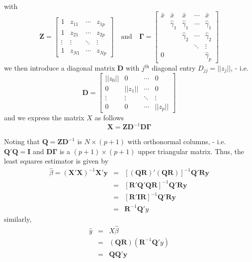 \documentclass{beamer}
\newcommand{\X}{\bm{X}}
\begin{document}
\begin{frame}
with 
\[
\bm{Z}=
\begin{bmatrix}
1 & z_{11} & \cdots & z_{1p}\\
1& z_{21} &\cdots&z_{2p}\\
\vdots&\vdots&\ddots&\vdots\\
1& z_{N1}&\cdots &z_{Np}
\end{bmatrix}\quad\text{and}\quad
\bm{\Gamma}=
\begin{bmatrix}
\bar{x}&\bar{x}&\bar{x}&\cdots&\bar{x}\\
&\hat{\gamma}_{1}&\hat{\gamma}_{1}&\cdots&\hat{\gamma}_1\\
&&\hat{\gamma}_{2}&\cdots& \hat{\gamma}_2\\
&&&\ddots&\vdots\\
0&&&&\hat{\gamma}_p
\end{bmatrix}
\]
we then introduce a diagonal matrix $\bm{D}$ with $j^{\text{th}}$ diagonal entry $D_{jj}=\lvert\lvert z_j\rvert\rvert$, - i.e. 
\[
\bm{D}=
\begin{bmatrix}
\lvert\lvert z_0\rvert\rvert&0&\cdots&0\\
0&\lvert\lvert z_1\rvert\rvert&\cdots&0\\
\vdots&\vdots&\ddots&\vdots\\
0&0&\cdots&\lvert\lvert z_p\rvert\rvert
\end{bmatrix}
\]
and we express the matrix $X$ as follows
\[
\X=\bm{Z}\bm{D}^{-1}\bm{D}\bm{\Gamma}
\]
\end{frame}
\begin{frame}
Noting that $\bm{Q}=\bm{Z}\bm{D}^{-1}$ is $N\times (p+1)$ with orthonormal columns, - i.e. $\bm{Q}'\bm{Q}=\bm{I}$ and $\bm{D\Gamma}$ is a $(p+1)\times(p+1)$ upper triangular matrix. 
Thus, the least squares estimator is given by
\begin{eqnarray*}
\hat{\beta}=(\X'\X)^{-1}\X'\bm{y}&=&[(\bm{Q}\bm{R})'(\bm{Q}\bm{R})]^{-1}\bm{Q}'\bm{R}\bm{y}\\
&=&[\bm{R}'\bm{Q}'\bm{Q}\bm{R}]^{-1}\bm{Q}'\bm{R}\bm{y}\\
&=&[\bm{R}'\bm{I}\bm{R}]^{-1}\bm{Q}'\bm{R}\bm{y}\\
&=&\bm{R}^{-1}\bm{Q}'y
\end{eqnarray*}
similarly,
\begin{eqnarray*}
\hat{y}&=&X\hat{\beta}\\
&=&(\bm{QR})(\bm{R}^{-1}\bm{Q}'y)\\
&=&\bm{Q}\bm{Q}'\bm{y}
\end{eqnarray*}
\end{frame}
%
%
\end{document}
